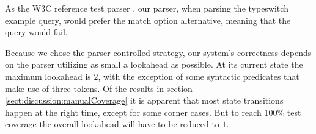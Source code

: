 As the W3C reference test parser \cite{parserTestPage}, our parser, when parsing the typeswitch example query, would prefer the match option alternative, meaning that the query would fail.

Because we chose the parser controlled strategy, our system's correctness depends on the parser utilizing as small a lookahead as possible. At its current state the maximum lookahead is $2$, with the exception of some syntactic predicates that make use of three tokens. Of the results in section \ref{sect:discussion:manualCoverage} it is apparent that most state transitions happen at the right time, except for some corner cases. But to reach 100\% test coverage the overall lookahead will have to be reduced to $1$. 
